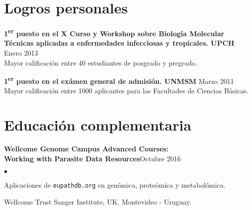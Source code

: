 \documentclass[margin,line]{res}
\newenvironment{list2}{
	\begin{list}{$\bullet$}{%
			\setlength{\itemsep}{0in}
			\setlength{\parsep}{0in} \setlength{\parskip}{0in}
			\setlength{\topsep}{0in} \setlength{\partopsep}{0in}
			\setlength{\leftmargin}{0.2in}}}{\end{list}}
\begin{document}
\begin{resume}
		
		\newpage
		
		\section{\sc Logros personales}
		
		{\bf 1\textsuperscript{er} puesto en el X Curso y Workshop sobre Biología Molecular \\Técnicas aplicadas a enfermedades infecciosas y tropicales. UPCH} \hfill Enero 2013\\
		Mayor calificación entre 40 estudiantes de posgrado y pregrado.
		
		{\bf 1\textsuperscript{er} puesto en el exámen general de admisión. UNMSM} \hfill Marzo 2011\\
		Mayor calificación entre 1000 aplicantes para las Facultades de Ciencias Básicas.\\

		
		\section{\sc Educación complementaria}
		
		{\bf Wellcome Genome Campus Advanced Courses:\\Working with Parasite Data Resources}\hfill {Octubre 2016}\\
		\vspace*{-.1in}%
		\begin{list2} %
			\item Aplicaciones de \texttt{eupathdb.org} en genómica, proteómica y metabolómica.
			\item Wellcome Trust Sanger Institute, UK. Montevideo - Uruguay.
		\end{list2}
		

\end{resume}
\end{document}

